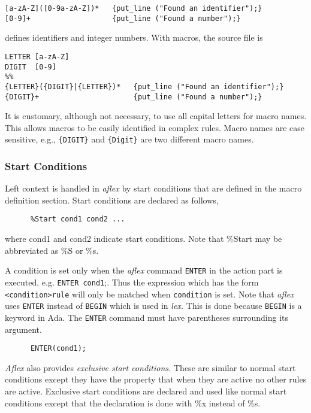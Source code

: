 \small
\begin{verbatim}
[a-zA-Z]([0-9a-zA-Z])*   {put_line ("Found an identifier");}
[0-9]+                   {put_line ("Found a number");}
\end{verbatim}
\normalsize

defines identifiers and integer numbers.  With macros, the source file is

\small
\begin{verbatim}
LETTER [a-zA-Z]
DIGIT  [0-9]
%%
{LETTER}({DIGIT}|{LETTER})*   {put_line ("Found an identifier");}
{DIGIT}+                      {put_line ("Found a number");}
\end{verbatim}
\normalsize

\mysk
It is customary, although not necessary, to use all capital letters
for macro names. This allows macros to be easily identified in complex rules.
Macro names are case sensitive, e.g., \verb|{DIGIT}| and \verb|{Digit}| are
two different macro names.

\subsubsection{Start Conditions}
Left context is handled in {\sl aflex} by start conditions that are defined 
in the macro definition section.  Start conditions are declared as follows,

\begin{verbatim}
      %Start cond1 cond2 ...
\end{verbatim}

where cond1 and cond2 indicate start conditions.
Note that \%Start may be abbreviated as \%S or \%s.

\mysk
A condition is set only when  the  {\sl aflex}  command  {\tt ENTER}  in  the
action  part  is executed, e.g. {\tt ENTER cond1};. Thus the expression 
which  has  the  form \verb|<condition>rule| will only be matched 
when {\tt condition} is set.  Note that {\sl aflex} uses {\tt ENTER}
instead of {\tt BEGIN} which is used in {\it lex.}  This is done
because {\tt BEGIN} is a keyword in Ada.  The {\tt ENTER} command must
have parentheses surrounding its argument.
\begin{verbatim}
      ENTER(cond1);
\end{verbatim}

{\sl Aflex} also provides {\it exclusive start conditions.}  These are
similar to normal start conditions except they have the property that
when they are active no other rules are active.  Exclusive start
conditions are declared and used like normal start conditions except
that the declaration is done with \%x instead of \%s.

